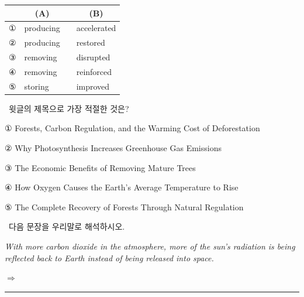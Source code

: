 \documentclass[11pt,a4paper]{article}
\newcommand{\qno}[1]{\par\vspace{8pt}\noindent{\sffamily\bfseries #1.}\ }
\newcommand{\instr}[1]{{\sffamily #1}\par\vspace{3pt}}
\begin{document}
\vspace{4pt}
\noindent
\renewcommand{\arraystretch}{1.3}
\begin{tabular}{clcl}
\toprule
 & \multicolumn{1}{c}{\sffamily (A)} & & \multicolumn{1}{c}{\sffamily (B)} \\
\midrule
① & producing & & accelerated \\
② & producing & & restored    \\
③ & removing  & & disrupted   \\
④ & removing  & & reinforced  \\
⑤ & storing   & & improved    \\
\bottomrule
\end{tabular}

\qno{3}\instr{윗글의 제목으로 가장 적절한 것은?}
\begin{choices}
\item ① Forests, Carbon Regulation, and the Warming Cost of Deforestation
\item ② Why Photosynthesis Increases Greenhouse Gas Emissions
\item ③ The Economic Benefits of Removing Mature Trees
\item ④ How Oxygen Causes the Earth's Average Temperature to Rise
\item ⑤ The Complete Recovery of Forests Through Natural Regulation
\end{choices}

\qno{4}\instr{[서술형] 다음 문장을 우리말로 해석하시오.}
\vspace{2pt}\par\noindent
\hspace{1em}\textit{With more carbon dioxide in the atmosphere, more of the sun's radiation is being reflected back to Earth instead of being released into space.}
\par\vspace{6pt}\noindent
$\Rightarrow$ \rule{\linewidth}{0.4pt}
\end{document}
